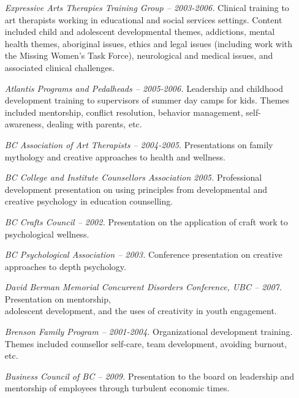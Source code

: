\documentclass[10pt,DIV09,letterpaper,oneside,headsepline]{scrreprt}
\begin{document}
\begin{itemize}
\item [\textit{Expressive Arts Therapies Training Group -- 2003-2006.}] 
Clinical training to art therapists working in educational and social services settings. Content included child and adolescent developmental themes, addictions, mental health themes, aboriginal issues, ethics and legal issues (including work with the Missing Women's Task Force), neurological and medical issues, and associated clinical challenges.

\item [\textit{Atlantis Programs and Pedalheads -- 2005-2006.}]
Leadership and childhood development training to supervisors of summer day camps for kids. Themes included mentorship, conflict resolution, behavior management, self-awareness, dealing with parents, etc.

\item [\textit{BC Association of Art Therapists -- 2004-2005.}]
Presentations on family mythology and creative approaches to health and wellness.

\item [\textit{BC College and Institute Counsellors Association 2005.}]
Professional development presentation on using principles from developmental and creative psychology in education counselling.

\item [\textit{BC Crafts Council -- 2002.}]
Presentation on the application of craft work to psychological wellness.

\item [\textit{BC Psychological Association -- 2003.}]
Conference presentation on creative approaches to depth psychology.

\item [\textit{David Berman Memorial Concurrent Disorders Conference, UBC -- 2007.}]
Presentation on mentorship,\\ adolescent development, and the uses of creativity in youth engagement.

\item [\textit{Brenson Family Program -- 2001-2004.}]
Organizational development training. Themes included counsellor self-care, team development, avoiding burnout, etc.

\item [\textit{Business Council of BC -- 2009.}]
Presentation to the board on leadership and mentorship of employees through turbulent economic times.


\end{itemize}
\end{document}

